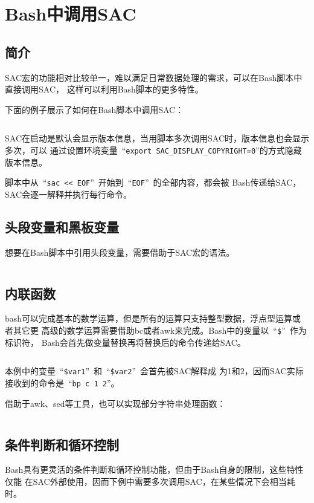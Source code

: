 \section{Bash中调用SAC}
\label{sec:sac-bash}

\subsection{简介}
SAC宏的功能相对比较单一，难以满足日常数据处理的需求，可以在Bash脚本中直接调用SAC，
这样可以利用Bash脚本的更多特性。

下面的例子展示了如何在Bash脚本中调用SAC：
\inputminted{bash}{./call-in-script/simple-script.sh}

SAC在启动是默认会显示版本信息，当用脚本多次调用SAC时，版本信息也会显示多次，可以
通过设置环境变量~``\lstinline{export SAC_DISPLAY_COPYRIGHT=0}''的方式隐藏版本信息。

脚本中从~``\lstinline{sac << EOF}''~开始到~``\lstinline{EOF}''~的全部内容，都会被
Bash传递给SAC，SAC会逐一解释并执行每行命令。

\subsection{头段变量和黑板变量}
想要在Bash脚本中引用头段变量，需要借助于SAC宏的语法。
\inputminted{bash}{./call-in-script/variables.sh}

\subsection{内联函数}
bash可以完成基本的数学运算，但是所有的运算只支持整型数据，浮点型运算或者其它更
高级的数学运算需要借助bc或者awk来完成。Bash中的变量以~``\lstinline{$}''~作为标识符，
Bash会首先做变量替换再将替换后的命令传递给SAC。
\inputminted{bash}{./call-in-script/arithmetic-functions.sh}

本例中的变量~``\lstinline{$var1}''~和~``\lstinline{$var2}''~会首先被SAC解释成
为1和2，因而SAC实际接收到的命令是~``\lstinline{bp c 1 2}''。

借助于awk、sed等工具，也可以实现部分字符串处理函数：
\inputminted{bash}{./call-in-script/string-functions.sh}

\subsection{条件判断和循环控制}
Bash具有更灵活的条件判断和循环控制功能，但由于Bash自身的限制，这些特性仅能
在SAC外部使用，因而下例中需要多次调用SAC，在某些情况下会相当耗时。
\inputminted{bash}{./call-in-script/do-loops.sh}
